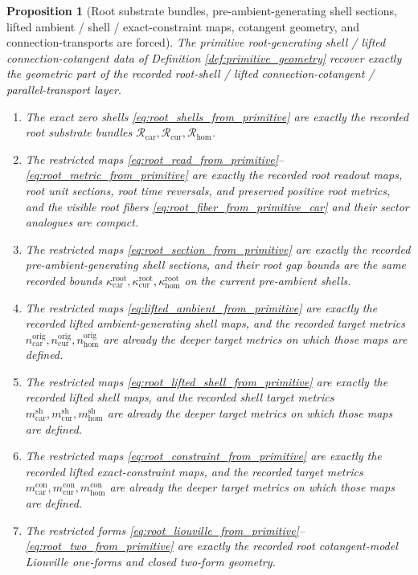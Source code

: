 \documentclass[11pt]{article}
\newcommand{\TensorShellMetric}{m_{\mathrm{car}}^{\mathrm{sh}}}
\newcommand{\CurShellMetric}{m_{\mathrm{cur}}^{\mathrm{sh}}}
\newcommand{\HomShellMetric}{m_{\mathrm{hom}}^{\mathrm{sh}}}
\newcommand{\TensorConstraintMetric}{m_{\mathrm{car}}^{\mathrm{con}}}
\newcommand{\CurConstraintMetric}{m_{\mathrm{cur}}^{\mathrm{con}}}
\newcommand{\HomConstraintMetric}{m_{\mathrm{hom}}^{\mathrm{con}}}
\newcommand{\TensorOriginTargetMetric}{n_{\mathrm{car}}^{\mathrm{orig}}}
\newcommand{\CurOriginTargetMetric}{n_{\mathrm{cur}}^{\mathrm{orig}}}
\newcommand{\HomOriginTargetMetric}{n_{\mathrm{hom}}^{\mathrm{orig}}}
\newcommand{\TensorRootSpace}{\mathcal R_{\mathrm{car}}}
\newcommand{\CurRootSpace}{\mathcal R_{\mathrm{cur}}}
\newcommand{\HomRootSpace}{\mathcal R_{\mathrm{hom}}}
\newcommand{\TensorRootGap}{\kappa_{\mathrm{car}}^{\mathrm{root}}}
\newcommand{\CurRootGap}{\kappa_{\mathrm{cur}}^{\mathrm{root}}}
\newcommand{\HomRootGap}{\kappa_{\mathrm{hom}}^{\mathrm{root}}}
\newtheorem{proposition}{Proposition}
\begin{document}
\begin{proposition}[Root substrate bundles, pre-ambient-generating shell sections, lifted ambient / shell / exact-constraint maps, cotangent geometry, and connection-transports are forced]
\label{prop:root_geometry_forced}
The primitive root-generating shell / lifted connection-cotangent data of Definition \ref{def:primitive_geometry} recover exactly the geometric part of the recorded root-shell / lifted connection-cotangent / parallel-transport layer.
\begin{enumerate}
    \item The exact zero shells \eqref{eq:root_shells_from_primitive} are exactly the recorded root substrate bundles \(\TensorRootSpace,\CurRootSpace,\HomRootSpace\).
    \item The restricted maps \eqref{eq:root_read_from_primitive}--\eqref{eq:root_metric_from_primitive} are exactly the recorded root readout maps, root unit sections, root time reversals, and preserved positive root metrics, and the visible root fibers \eqref{eq:root_fiber_from_primitive_car} and their sector analogues are compact.
    \item The restricted maps \eqref{eq:root_section_from_primitive} are exactly the recorded pre-ambient-generating shell sections, and their root gap bounds are the same recorded bounds \(\TensorRootGap,\CurRootGap,\HomRootGap\) on the current pre-ambient shells.
    \item The restricted maps \eqref{eq:lifted_ambient_from_primitive} are exactly the recorded lifted ambient-generating shell maps, and the recorded target metrics \(\TensorOriginTargetMetric,\CurOriginTargetMetric,\HomOriginTargetMetric\) are already the deeper target metrics on which those maps are defined.
    \item The restricted maps \eqref{eq:root_lifted_shell_from_primitive} are exactly the recorded lifted shell maps, and the recorded shell target metrics \(\TensorShellMetric,\CurShellMetric,\HomShellMetric\) are already the deeper target metrics on which those maps are defined.
    \item The restricted maps \eqref{eq:root_constraint_from_primitive} are exactly the recorded lifted exact-constraint maps, and the recorded target metrics \(\TensorConstraintMetric,\CurConstraintMetric,\HomConstraintMetric\) are already the deeper target metrics on which those maps are defined.
    \item The restricted forms \eqref{eq:root_liouville_from_primitive}--\eqref{eq:root_two_from_primitive} are exactly the recorded root cotangent-model Liouville one-forms and closed two-form geometry.

\end{enumerate}
\end{proposition}
\end{document}
